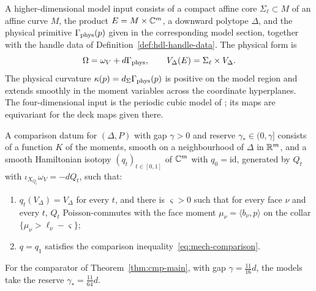 \begin{definition}\label{def:mech-model}
A higher-dimensional model input consists of a compact affine core $\Sigma_\ell\subset M$ of an affine
curve $M$, the product $E=M\times\mathbb{C}^m$, a downward polytope $\Delta$, and the physical primitive
$\Gamma_{\rm phys}(p)$ given in the corresponding model section, together with the handle data of
Definition~\ref{def:hdl-handle-data}. The physical form is
\[
 \Omega=\omega_V+d\Gamma_{\rm phys},\qquad
 V_\Delta(E)=\Sigma_\ell\times V_\Delta.
\]
The physical curvature $\kappa(p)=d_\Sigma\Gamma_{\rm phys}(p)$ is positive on the model region and extends
smoothly in the moment variables across the coordinate hyperplanes. The four-dimensional input is the
periodic cubic model of ; its maps are equivariant for the deck maps
given there.
\end{definition}

\begin{definition}\label{def:mech-datum}
A comparison datum for $(\Delta,P)$ with gap $\gamma>0$ and reserve $\gamma_*\in(0,\gamma]$ consists of a function
$K$ of the moments, smooth on a neighbourhood of $\Delta$ in $\mathbb{R}^m$, and a smooth Hamiltonian isotopy
$(q_t)_{t\in[0,1]}$ of $\mathbb{C}^m$ with $q_0=\mathrm{id}$, generated by $Q_t$ with $\iota_{X_{Q_t}}\omega_V=-dQ_t$,
such that:
\begin{enumerate}[label=(\arabic*),ref=(\arabic*)]
\item\label{it:mech-datum-collar} $q_t(V_\Delta)=V_\Delta$ for every $t$, and there is $\varsigma>0$ such that
 for every face $\nu$ and every $t$, $Q_t$ Poisson-commutes with the face moment $\mu_\nu=\langle b_\nu,p\rangle$ on
 the collar $\{\mu_\nu>\ell_\nu-\varsigma\}$;
\item\label{it:mech-datum-cmp} $q=q_1$ satisfies the comparison inequality~\eqref{eq:mech-comparison}.
\end{enumerate}
For the comparator of Theorem~\ref{thm:cmp-main}, with gap $\gamma=\frac{11}{16}d$, the models take the reserve
$\gamma_*=\frac{11}{64}d$.
\end{definition}

